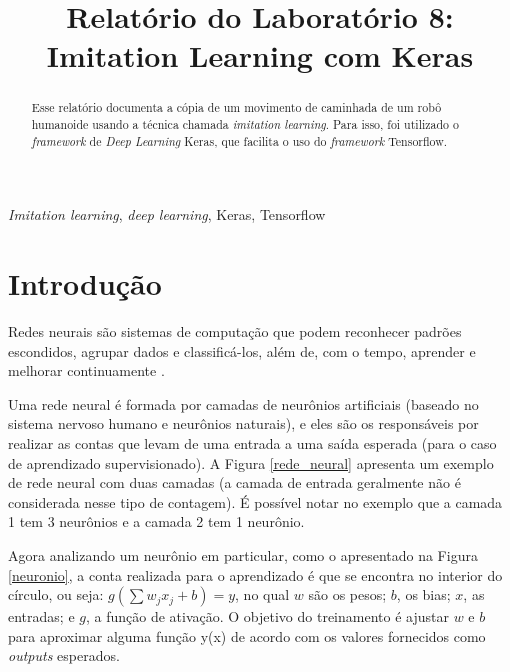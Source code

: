 \documentclass[conference]{IEEEtran}
\begin{document}
\title{Relatório do Laboratório 8: \\ Imitation Learning com Keras\\
}

\author{
}

\maketitle

\begin{abstract}
Esse relatório documenta a cópia de um movimento de caminhada de um robô humanoide usando a técnica chamada \textit{imitation learning}. Para isso, foi utilizado o \textit{framework} de \textit{Deep Learning} Keras, que facilita o uso do \textit{framework} Tensorflow.
\end{abstract}

\begin{IEEEkeywords}
\textit{Imitation learning}, \textit{deep learning}, Keras, Tensorflow
\end{IEEEkeywords}

\section{Introdução}
Redes neurais são sistemas de computação que podem reconhecer padrões escondidos, agrupar dados e classificá-los, além de, com o tempo, aprender e melhorar continuamente \cite{sas}.

Uma rede neural é formada por camadas de neurônios artificiais (baseado no sistema nervoso humano e neurônios naturais), e eles são os responsáveis por realizar as contas que levam de uma entrada a uma saída esperada (para o caso de aprendizado supervisionado). A Figura \ref{rede_neural} apresenta um exemplo de rede neural com duas camadas (a camada de entrada geralmente não é considerada nesse tipo de contagem). É possível notar no exemplo que a camada 1 tem 3 neurônios e a camada 2 tem 1 neurônio. 

Agora analizando um neurônio em particular, como o apresentado na Figura \ref{neuronio}, a conta realizada para o aprendizado é que se encontra no interior do círculo, ou seja: $g\left ( \sum w_j x_j + b \right ) = y$, no qual $w$ são os pesos; $b$, os bias; $x$, as entradas; e $g$, a função de ativação. O objetivo do treinamento é ajustar $w$ e $b$ para aproximar alguma função y(x) de acordo com os valores fornecidos como \textit{outputs} esperados.
\end{document}
